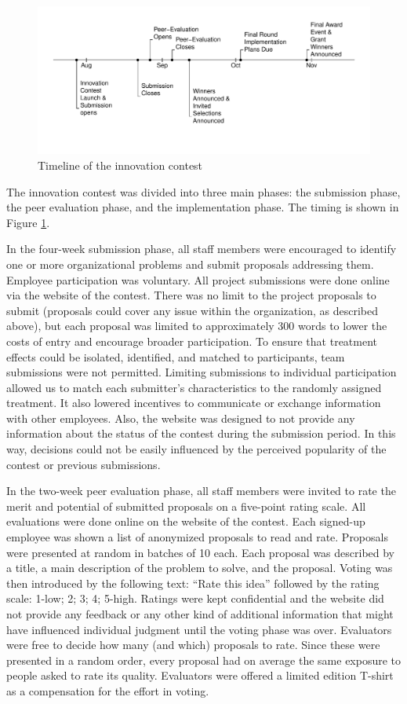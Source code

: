 \documentclass[12pt, titlepage]{article}
\begin{document}
\begin{figure}
\centering
\includegraphics{Figures/timeline-1.pdf}
\caption{Timeline of the innovation contest\label{fig: phase}}
\end{figure}

The innovation contest was divided into three main phases: the
submission phase, the peer evaluation phase, and the implementation
phase. The timing is shown in Figure \ref{fig: phase}.

In the four-week submission phase, all staff members were encouraged to
identify one or more organizational problems and submit proposals
addressing them. Employee participation was voluntary. All project
submissions were done online via the website of the contest. There was
no limit to the project proposals to submit (proposals could cover any
issue within the organization, as described above), but each proposal
was limited to approximately 300 words to lower the costs of entry and
encourage broader participation. To ensure that treatment effects could
be isolated, identified, and matched to participants, team submissions
were not permitted. Limiting submissions to individual participation
allowed us to match each submitter's characteristics to the randomly
assigned treatment. It also lowered incentives to communicate or
exchange information with other employees. Also, the website was
designed to not provide any information about the status of the contest
during the submission period. In this way, decisions could not be easily
influenced by the perceived popularity of the contest or previous
submissions.

In the two-week peer evaluation phase, all staff members were invited to
rate the merit and potential of submitted proposals on a five-point
rating scale. All evaluations were done online on the website of the
contest. Each signed-up employee was shown a list of anonymized
proposals to read and rate. Proposals were presented at random in
batches of 10 each. Each proposal was described by a title, a main
description of the problem to solve, and the proposal. Voting was then
introduced by the following text: ``Rate this idea'' followed by the
rating scale: 1-low; 2; 3; 4; 5-high. Ratings were kept confidential and
the website did not provide any feedback or any other kind of additional
information that might have influenced individual judgment until the
voting phase was over. Evaluators were free to decide how many (and
which) proposals to rate. Since these were presented in a random order,
every proposal had on average the same exposure to people asked to rate
its quality. Evaluators were offered a limited edition T-shirt as a
compensation for the effort in voting.
\end{document}
